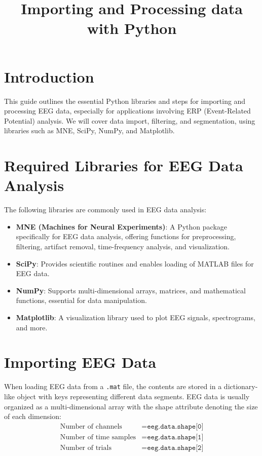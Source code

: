 \documentclass{article}
\title{Importing and Processing data with Python}
\author{}
\date{}
\begin{document}
\maketitle

\section{Introduction}
This guide outlines the essential Python libraries and steps for importing and processing EEG data, especially for applications involving ERP (Event-Related Potential) analysis. We will cover data import, filtering, and segmentation, using libraries such as MNE, SciPy, NumPy, and Matplotlib.

\section{Required Libraries for EEG Data Analysis}
The following libraries are commonly used in EEG data analysis:
\begin{itemize}
    \item \textbf{MNE (Machines for Neural Experiments)}: A Python package specifically for EEG data analysis, offering functions for preprocessing, filtering, artifact removal, time-frequency analysis, and visualization.
    \item \textbf{SciPy}: Provides scientific routines and enables loading of MATLAB files for EEG data.
    \item \textbf{NumPy}: Supports multi-dimensional arrays, matrices, and mathematical functions, essential for data manipulation.
    \item \textbf{Matplotlib}: A visualization library used to plot EEG signals, spectrograms, and more.
\end{itemize}

\section{Importing EEG Data}
When loading EEG data from a \texttt{.mat} file, the contents are stored in a dictionary-like object with keys representing different data segments. EEG data is usually organized as a multi-dimensional array with the shape attribute denoting the size of each dimension:
\begin{align*}
    \text{Number of channels} &= \texttt{eeg.data.shape[0]} \\
    \text{Number of time samples} &= \texttt{eeg.data.shape[1]} \\
    \text{Number of trials} &= \texttt{eeg.data.shape[2]}
\end{align*}
\end{document}

